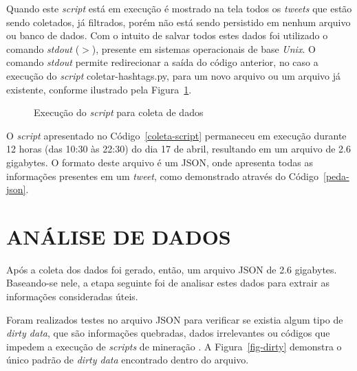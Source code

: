 Quando este \textit{script} está em execução é mostrado na tela todos os \textit{tweets} que estão sendo coletados, já filtrados, porém não está sendo persistido em nenhum arquivo ou banco de dados. Com o intuito de salvar todos estes dados foi utilizado o comando \textit{stdout} ($>$), presente em sistemas operacionais de base \textit{Unix}. O comando \textit{stdout} permite redirecionar a saída do código anterior, no caso a execução do \textit{script} coletar-hashtags.py, para um novo arquivo ou um arquivo já existente, conforme ilustrado pela Figura~\ref{exec-coleta}.

\begin{figure}[h]
	\centering
	\caption{Execução do \textit{script} para coleta de dados}
	\vspace{-0.3cm}
	\label{exec-coleta}
\end{figure}

O \textit{script} apresentado no Código~\ref{coleta-script} permaneceu em execução durante 12 horas (das 10:30 às 22:30) do dia 17 de abril, resultando em um arquivo de 2.6 gigabytes. O formato deste arquivo é um JSON, onde apresenta todas as informações presentes em um \textit{tweet}, como demonstrado através do Código~\ref{peda-json}.



\section{ANÁLISE DE DADOS}
Após a coleta dos dados foi gerado, então, um arquivo JSON de 2.6 gigabytes. Baseando-se nele, a etapa seguinte foi de analisar estes dados para extrair as informações consideradas úteis.

Foram realizados testes no arquivo JSON para verificar se existia algum tipo de \textit{dirty data}, que são informações quebradas, dados irrelevantes ou códigos que impedem a execução de \textit{scripts} de mineração \cite{dirty-data}. A Figura~\ref{fig-dirty} demonstra o único padrão de \textit{dirty data} encontrado dentro do arquivo.

